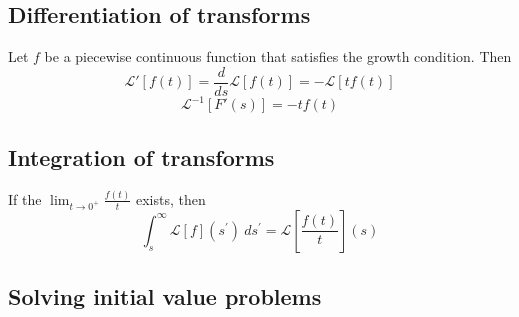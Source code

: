 \subsection{Differentiation of transforms}
Let $f$ be a piecewise continuous function that satisfies the growth condition. Then
\begin{equation*}
    \mathcal{L}'[f(t)] = \frac{d}{ds}\mathcal{L}[f(t)] = -\mathcal{L}[t f(t)]
\end{equation*}
\begin{equation*}
    \mathcal{L}^{-1}[F'(s)] = -tf(t)
\end{equation*}

\subsection{Integration of transforms}
If the $\lim_{t\to 0^+}\frac{f(t)}{t}$ exists, then
\begin{equation*}
    \int_{s}^{\infty}\mathcal{L}[f](s^{\prime})\mathrm{~}ds^{\prime}=\mathcal{L}\left[\frac{f(t)}t\right](s)
\end{equation*}

\subsection{Solving initial value problems}

